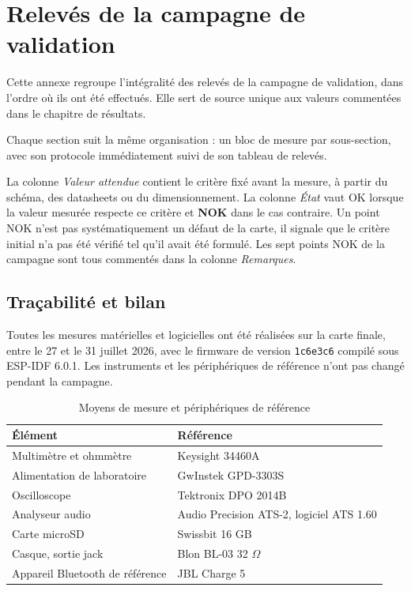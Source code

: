 \chapter{Relevés de la campagne de validation}
\label{ann:mesures}

Cette annexe regroupe l'intégralité des relevés de la campagne de validation, dans l'ordre où ils ont été effectués. Elle sert de source unique aux valeurs commentées dans le chapitre de résultats.

Chaque section suit la même organisation : un bloc de mesure par sous-section, avec son protocole immédiatement suivi de son tableau de relevés.

La colonne \textit{Valeur attendue} contient le critère fixé avant la mesure, à partir du schéma, des datasheets ou du dimensionnement. La colonne \textit{État} vaut OK lorsque la valeur mesurée respecte ce critère et \textbf{NOK} dans le cas contraire. Un point NOK n'est pas systématiquement un défaut de la carte, il signale que le critère initial n'a pas été vérifié tel qu'il avait été formulé. Les sept points NOK de la campagne sont tous commentés dans la colonne \textit{Remarques}.

\section{Traçabilité et bilan}
\label{ann:mesures_tracabilite}

Toutes les mesures matérielles et logicielles ont été réalisées sur la carte finale, entre le 27 et le 31 juillet 2026, avec le firmware de version \texttt{1c6e3c6} compilé sous ESP-IDF 6.0.1. Les instruments et les périphériques de référence n'ont pas changé pendant la campagne.

\begin{table}[H]
  \centering
  \caption{Moyens de mesure et périphériques de référence}
  \label{tab:ann_tracabilite}
  \small
  \begin{tabular}{@{}>{\raggedright\arraybackslash}p{} >{\raggedright\arraybackslash}p{}@{}}
    \toprule
    \textbf{Élément}                & \textbf{Référence}                       \\
    \midrule
    Multimètre et ohmmètre          & Keysight 34460A                          \\
    Alimentation de laboratoire     & GwInstek GPD-3303S                       \\
    Oscilloscope                    & Tektronix DPO 2014B                      \\
    Analyseur audio                 & Audio Precision ATS-2, logiciel ATS 1.60 \\
    Carte microSD                   & Swissbit 16 GB                           \\
    Casque, sortie jack             & Blon BL-03 32 $\Omega$                   \\
    Appareil Bluetooth de référence & JBL Charge 5                             \\
    \bottomrule
  \end{tabular}
\end{table}


